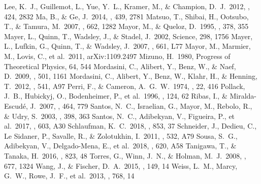 \documentclass[twocolumn, dvipdfmx]{aastex62}
\begin{document}
\begin{CJK*}{UTF8}{min}
\begin{thebibliography}{}
 Lee, K.~J., Guillemot, L., Yue, Y.~L., Kramer, M., \& Champion, D.~J.\ 2012, \mnras, 424, 2832
 Ma, B., \& Ge, J.\ 2014, \mnras, 439, 2781
 Matsuo, T., Shibai, H., Ootsubo, T., \& Tamura, M.\ 2007, \apj, 662, 1282
 Mayor, M., \& Queloz, D.\ 1995, \nat, 378, 355
 Mayer, L., Quinn, T., Wadsley, J., \& Stadel, J.\ 2002, Science, 298, 1756
 Mayer, L., Lufkin, G., Quinn, T., \& Wadsley, J.\ 2007, \apjl, 661, L77
 Mayor, M., Marmier, M., Lovis, C., et al.\ 2011, arXiv:1109.2497
 Mizuno, H.\ 1980, Progress of Theoretical Physics, 64, 544
 Mordasini, C., Alibert, Y., Benz, W., \& Naef, D.\ 2009, \aap, 501, 1161
 Mordasini, C., Alibert, Y., Benz, W., Klahr, H., \& Henning, T.\ 2012, \aap, 541, A97
 Perri, F., \& Cameron, A.~G.~W.\ 1974, \icarus, 22, 416
 Pollack, J.~B., Hubickyj, O., Bodenheimer, P., et al.\ 1996, \icarus, 124, 62
 Ribas, I., \& Miralda-Escud{\'e}, J.\ 2007, \aap, 464, 779
 Santos, N.~C., Israelian, G., Mayor, M., Rebolo, R., \& Udry, S.\ 2003, \aap, 398, 363
 Santos, N.~C., Adibekyan, V., Figueira, P., et al.\ 2017, \aap, 603, A30
 Schlaufman, K.~C.\ 2018, \apj, 853, 37
 Schneider, J., Dedieu, C., Le Sidaner, P., Savalle, R., \& Zolotukhin, I.\ 2011, \aap, 532, A79
 Sousa, S.~G., Adibekyan, V., Delgado-Mena, E., et al.\ 2018, \aap, 620, A58
 Tanigawa, T., \& Tanaka, H.\ 2016, \apj, 823, 48
 Torres, G., Winn, J.~N., \& Holman, M.~J.\ 2008, \apj, 677, 1324
 Wang, J., \& Fischer, D.~A.\ 2015, \aj, 149, 14
 Weiss, L.~M., Marcy, G.~W., Rowe, J.~F., et al.\ 2013, \apj, 768, 14

\end{thebibliography}


\end{CJK*}
\end{document}
